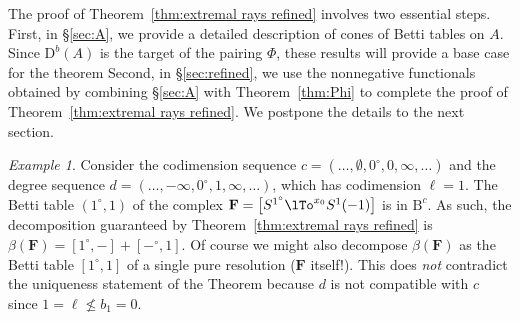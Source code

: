 \documentclass[12pt]{amsart}
\theoremstyle{definition}
\theoremstyle{remark}
\newtheorem{example}[lemma]{Example}
\newcommand{\bb}{c}
\newcommand{\dd}{d}
\newcommand{\FF}{\mathbf{F}}
\newcommand{\nothing}{\emptyset}
\newcommand{\DD}{\mathrm{D}}
\newcommand{\BBQ}{\mathrm{B}}
\begin{document}
The proof of Theorem~\ref{thm:extremal rays refined} involves two essential steps.  First, in \S\ref{sec:A}, we provide a detailed description of cones of Betti tables on $A$.  Since $\DD^b(A)$ is the target of the pairing $\Phi$, these results will provide a base case for the theorem  Second, in \S\ref{sec:refined}, 
we use the nonnegative functionals obtained by combining  \S\ref{sec:A} with Theorem~\ref{thm:Phi} to complete the proof of Theorem~\ref{thm:extremal rays refined}. 
We postpone the details to the next section.
%
%

\begin{example}  

 Consider the codimension sequence $\bb=(\dots, \nothing,0^\circ,0,\infty,\dots)$ and the degree sequence $\dd=(\dots, -\infty,0^\circ ,1,\infty,\dots)$, which has codimension $\ell = 1$.  The Betti table 
 $(1^\circ, 1)$ of the complex $\FF=\left[ S^{1^\circ}\lTo^{x_{0}} S^1(-1)\right]$ is in $\BBQ^{\bb}$.
 As such, the decomposition guaranteed by Theorem~\ref{thm:extremal rays refined} is
 $\beta(\FF) = [1^{\circ}, -] + [-^{\circ}, 1]$. Of course we might also decompose $\beta(\FF)$
 as the Betti table $[1^{\circ}, 1]$ of a single pure resolution ($\FF$ itself!). This does \emph{not} contradict the uniqueness statement of the Theorem because $\dd$ is not compatible with $\bb$
 since $1= \ell \not\leq b_{1}= 0$.
\end{example}

% 
% 
%
%
\end{document}
